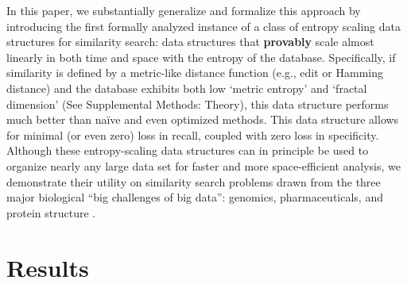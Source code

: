 \documentclass[review,preprint,12pt]{elsarticle}
\renewcommand{\cite}{\citep} %
\theoremstyle{definition}
\theoremstyle{remark}
\numberwithin{equation}{section}
\begin{document}
In this paper, we substantially generalize and formalize this approach by introducing the first formally analyzed instance of a class of entropy scaling data structures for similarity search: data structures that \textbf{provably} scale almost linearly in both time and space with the entropy of the database.
Specifically, if similarity is defined by a metric-like distance function (e.g., edit or Hamming distance) and the database exhibits both low `metric entropy' and `fractal dimension' (See Supplemental Methods: Theory), this data structure performs much better than na\"ive and even optimized methods.
This data structure allows for minimal (or even zero) loss in recall, coupled
with zero loss in specificity.
Although these entropy-scaling data structures can in principle be used to organize nearly any large data set for faster and more space-efficient analysis,
we demonstrate their utility on similarity search problems drawn from the three major biological ``big challenges of big data'': genomics, pharmaceuticals, and protein structure \cite{marx2013biology}.

\section{Results}
\end{document}
